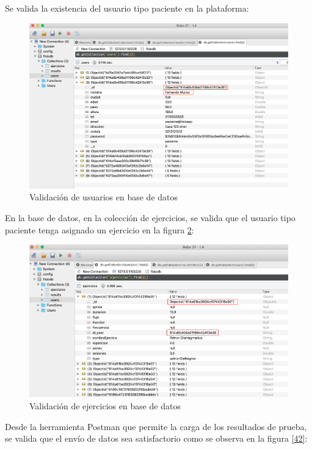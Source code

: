 \documentclass[12pt]{article}
\begin{document}
Se valida la existencia del usuario tipo paciente en la plataforma:
\begin{figure}[ht]
\centering
\includegraphics[scale=0.3]{imag/TEST1User.png}
\caption{Validación de usuarios en base de datos}
\label{40}
\end{figure}
\FloatBarrier

En la base de datos, en la colección de ejercicios, se valida que el usuario tipo paciente tenga asignado un ejercicio en la figura \ref{41}:

\begin{figure}[ht]
\centering
\includegraphics[scale=0.3]{imag/TEST2Ejercicio.png}
\caption{Validación de ejercicios en base de datos}
\label{41}
\end{figure}
\FloatBarrier

Desde la herramienta Postman que permite la carga de los resultados de prueba, se valida que el envío de datos sea satisfactorio como se observa en la figura \ref{42}:
\end{document}
